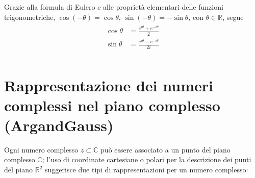 \documentclass[letterpaper,10pt,italian]{jupyterBook}
\begin{document}
\sphinxAtStartPar
Grazie alla formula di Eulero e alle proprietà elementari delle funzioni trigonometriche, \(\cos(-\theta) = \cos \theta\), \(\sin(-\theta) = -\sin \theta\), con \(\theta \in \mathbb{R}\), segue
\begin{equation}\label{equation:ch/algebra/complex-algebra:complex:cos-sin}
\begin{split}\begin{aligned}
 \cos \theta & = \frac{e^{i\theta} + e^{-i\theta}}{2} \\
 \sin \theta & = \frac{e^{i\theta} - e^{-i\theta}}{2i} \\
\end{aligned}\end{split}
\end{equation}

\section{Rappresentazione dei numeri complessi nel piano complesso (Argand\sphinxhyphen{}Gauss)}
\label{\detokenize{ch/algebra/complex-algebra:rappresentazione-dei-numeri-complessi-nel-piano-complesso-argand-gauss}}\label{\detokenize{ch/algebra/complex-algebra:math-hs-algebra-complex-complex-plane}}
\sphinxAtStartPar
Ogni numero complesso \(z \subset \mathbb{C}\) può essere associato a un punto del piano complesso \(\mathbb{C}\); l’uso di coordinate cartesiane o polari per la descrizione dei punti del piano \(\mathbb{R}^2\) suggerisce due tipi di rappresentazioni per un numero complesso:
\end{document}
